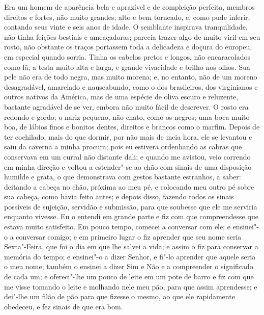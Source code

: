 Era um homem de aparência bela e aprazível e de compleição perfeita,
membros direitos e fortes, não muito grandes; alto e bem torneado, e,
como pude inferir, contando seus vinte e seis anos de idade. O semblante
inspirava tranquilidade, não tinha feições bestiais e ameaçadoras;
parecia trazer algo de muito viril em seu rosto, não obstante os traços
portassem toda a delicadeza e doçura do europeu, em especial quando
sorria. Tinha os cabelos pretos e longos, não encaracolados como lã; a
testa muito alta e larga, e grande vivacidade e brilho nos olhos. Sua
pele não era de todo negra, mas muito morena; e, no entanto, não de um
moreno desagradável, amarelado e nauseabundo, como o dos brasileiros,
dos virginianos e outros nativos da América, mas de uma espécie de oliva
escuro e reluzente, bastante agradável de se ver, embora não muito fácil
de descrever. O rosto era redondo e gordo; o nariz pequeno, não chato,
como os negros; uma boca muito boa, de lábios finos e bonitos dentes,
direitos e brancos como o marfim. Depois de ter cochilado, mais do que
dormir, por não mais de meia hora, ele se levantou e saiu da caverna a
minha procura; pois eu estivera ordenhando as cabras que conservava em
um curral não distante dali; e quando me avistou, veio correndo em minha
direção e voltou a estender"-se ao chão com sinais de uma disposição
humilde e grata, o que demonstrava com gestos bastante estranhos, a
saber: deitando a cabeça no chão, próxima ao meu pé, e colocando meu
outro pé sobre sua cabeça, como havia feito antes; e depois disso,
fazendo todos os sinais possíveis de sujeição, servidão e submissão,
para que soubesse que ele me serviria enquanto vivesse. Eu o entendi em
grande parte e fiz com que compreendesse que estava muito satisfeito. Em
pouco tempo, comecei a conversar com ele; e ensinei"-o a conversar
comigo; e em primeiro lugar o fiz aprender que seu nome seria
Sexta"-Feira, que foi o dia em que lhe salvei a vida; e assim o fiz para
conservar a memória do tempo; e ensinei"-o a dizer Senhor, e fi"-lo
aprender que aquele seria o meu nome; também o ensinei a dizer Sim e Não
e a compreender o significado de cada um; e ofereci"-lhe um pouco de
leite em um pote de barro e fiz com que me visse tomando o leite e
molhando nele meu pão, para que assim aprendesse; e dei"-lhe um filão de
pão para que fizesse o mesmo, ao que ele rapidamente obedeceu, e fez
sinais de que era bom.

